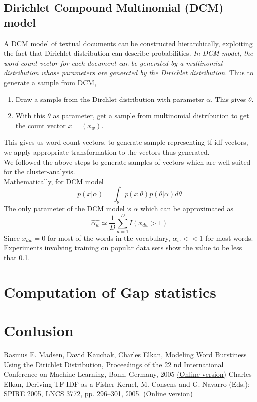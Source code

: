 \documentclass[10pt]{article}
\begin{document}
\subsection{Dirichlet Compound Multinomial (DCM) model}
A DCM model of textual documents can be constructed hierarchically, exploiting the fact that Dirichlet distribution can describe probabilities. {\em In DCM model, the word-count vector for each document can be generated by a multinomial distribution whose parameters are generated by the Dirichlet distribution.} Thus to generate a sample from DCM,
\begin{enumerate}
\item Draw a sample from the Dirchlet distribution with parameter $\alpha$. This gives $\theta$.
\item With this $\theta$ as parameter, get a sample from multinomial distribution to get the count vector $x=(x_w)$.
\end{enumerate}
This gives us word-count vectors, to generate sample representing tf-idf vectors, we apply appropriate transformation to the vectors thus generated. \\ 
We followed the above steps to generate samples of vectors which are well-suited for the cluster-analysis. \\
Mathematically, for DCM model
\begin{equation}
p(x| \alpha) = \int_{\theta} p(x| \theta) p(\theta | \alpha) d\theta
\end{equation}
The only parameter of the DCM model is $\alpha$ which can be approximated as 
\begin{equation}
\hat{\alpha_w} \simeq \frac{1}{D} \sum_{d=1}^D I(x_{dw} > 1)
\end{equation}
Since $x_{dw} = 0$ for most of the words in the vocabulary, $\alpha_w << 1$ for most words. Experiments involving training on popular data sets show the value to be less that 0.1.

	\section{Computation of Gap statistics}
	\section{Conlusion}
	


\begin{thebibliography}{100}

 Rasmus E. Madsen, David Kauchak, Charles Elkan, Modeling Word Burstiness Using the Dirichlet Distribution, Proceedings of the 22 nd International Conference on Machine Learning, Bonn, Germany, 2005 \href{http://www.machinelearning.org/proceedings/icml2005/papers/069_WordBursting_MadsenEtAl.pdf}{(Online version)}
 Charles Elkan, Deriving TF-IDF as a Fisher Kernel, M. Consens and G. Navarro (Eds.): SPIRE 2005, LNCS 3772, pp. 296–301, 2005. \href{http://cseweb.ucsd.edu/~elkan/papers/spire05.pdf}{(Online version)}




\end{thebibliography}
\end{document}
